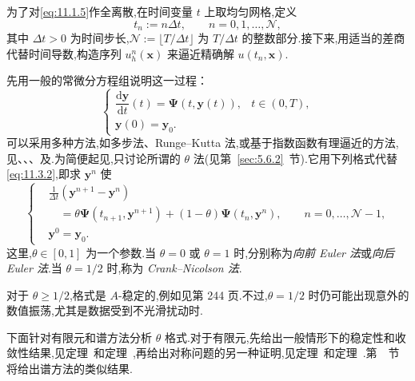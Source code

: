 为了对\eqref{eq:11.1.5}作全离散,在时间变量 \(t\) 上取均匀网格,定义
\begin{equation}\label{eq:11.3.1}
  t_n:=n\Delta t,\qquad n=0,1,\ldots,\mathcal N,
\end{equation}
其中 \(\Delta t>0\) 为时间步长,\(\mathcal N:=\lfloor T/\Delta t\rfloor\) 为 \(T/\Delta t\) 的整数部分.接下来,用适当的差商代替时间导数,构造序列 \(u_h^n(\boldsymbol{x})\) 来逼近精确解 \(u(t_n,\boldsymbol{x})\).

先用一般的常微分方程组说明这一过程：
\begin{equation}\label{eq:11.3.2}
  \begin{cases}
    \dfrac{\mathrm d\boldsymbol{y}}{\mathrm dt}(t)=\boldsymbol{\Psi}(t,\boldsymbol{y}(t)),&t\in(0,T),\\
    \boldsymbol{y}(0)=\boldsymbol{y}_0.&
  \end{cases}
\end{equation}
可以采用多种方法,如多步法、Runge--Kutta 法,或基于指数函数有理逼近的方法,见、、、及.为简便起见,只讨论所谓的 \(\theta\) 法(见第~\ref{sec:5.6.2}~节).它用下列格式代替\eqref{eq:11.3.2},即求 \(\boldsymbol{y}^n\) 使
\begin{equation}\label{eq:11.3.3}
  \left\{
  \begin{aligned}
    &\frac1{\Delta t}(\boldsymbol{y}^{n+1}-\boldsymbol{y}^n)\\
    &\quad=\theta\boldsymbol{\Psi}(t_{n+1},\boldsymbol{y}^{n+1})
          +(1-\theta)\boldsymbol{\Psi}(t_n,\boldsymbol{y}^n),\qquad n=0,\ldots,\mathcal N-1,\\
    &\boldsymbol{y}^0=\boldsymbol{y}_0 .
  \end{aligned}
  \right.
\end{equation}
这里,\(\theta\in[0,1]\) 为一个参数.当 \(\theta=0\) 或 \(\theta=1\) 时,分别称为\emph{向前 Euler 法}或\emph{向后 Euler 法}.当 \(\theta=1/2\) 时,称为 \emph{Crank--Nicolson 法}.

对于 \(\theta\ge1/2\),格式是 \(A\)-稳定的,例如见第 244 页.不过,\(\theta=1/2\) 时仍可能出现意外的数值振荡,尤其是数据受到不光滑扰动时.

下面针对有限元和谱方法分析 \(\theta\) 格式.对于有限元,先给出一般情形下的稳定性和收敛性结果,见定理~和定理~,再给出对称问题的另一种证明,见定理~和定理~.第~~节将给出谱方法的类似结果.

